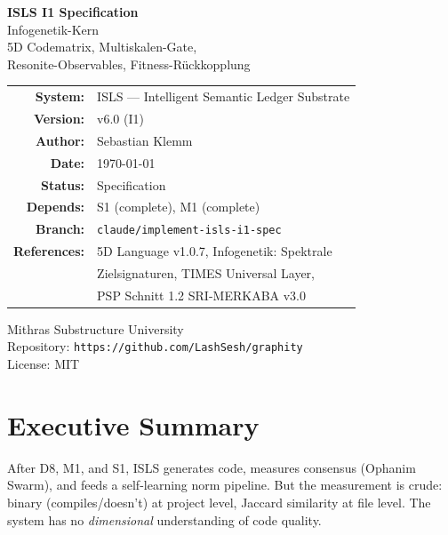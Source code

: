 \documentclass[11pt,a4paper]{article}
\begin{document}
\begin{titlepage}
\centering
\vspace*{2.5cm}

{\Huge\bfseries\color{isls-blue} ISLS I1 Specification}\\[0.5cm]
{\LARGE\color{isls-orange} Infogenetik-Kern}\\[0.3cm]
{\large\color{isls-gray} 5D Codematrix, Multiskalen-Gate,\\
Resonite-Observables, Fitness-R\"uckkopplung}\\[2cm]

{\large
\begin{tabular}{rl}
\textbf{System:}       & ISLS --- Intelligent Semantic Ledger Substrate \\
\textbf{Version:}      & v6.0 (I1) \\
\textbf{Author:}       & Sebastian Klemm \\
\textbf{Date:}         & \today \\
\textbf{Status:}       & Specification \\
\textbf{Depends:}      & S1 (complete), M1 (complete) \\
\textbf{Branch:}       & \texttt{claude/implement-isls-i1-spec} \\
\textbf{References:}   & 5D Language v1.0.7, Infogenetik: Spektrale \\
                        & Zielsignaturen, TIMES Universal Layer, \\
                        & PSP Schnitt 1.2 SRI-MERKABA v3.0 \\
\end{tabular}
}

\vfill

{\small\color{isls-gray}
Mithras Substructure University\\
Repository: \texttt{https://github.com/LashSesh/graphity}\\
License: MIT
}
\end{titlepage}

\tableofcontents
\newpage


\section{Executive Summary}

After D8, M1, and S1, ISLS generates code, measures consensus 
(Ophanim Swarm), and feeds a self-learning norm pipeline. But 
the measurement is crude: binary (compiles/doesn't) at project 
level, Jaccard similarity at file level. The system has no 
\emph{dimensional} understanding of code quality.
\end{document}
